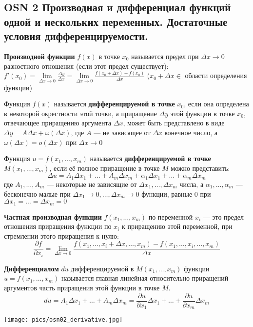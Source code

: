 \subsection*{OSN 2 Производная и дифференциал функций одной и нескольких переменных. Достаточные условия дифференцируемости.}

\textbf{Производной функции} $f(x)$ в точке $x_0$ называется предел при $\Delta x \to 0$ разностного отношения (если этот предел существует): $f'(x_0) = \lim \limits_{\Delta x \to 0}\frac{\Delta y}{\Delta x} = \lim \limits_{\Delta x \to 0} \frac{f(x_0+\Delta x)-f(x_0)}{\Delta x}$ ($x_0 + \Delta x \in$ области определения функции)

\bigbreak
Функция $f(x)$ называется \textbf{дифференцируемой в точке} $x_0$, если она определена в некоторой окрестности этой точки, а приращение $\Delta y$ этой функции в точке $x_0$, отвечающее приращению аргумента $\Delta x$, может быть представлено в виде $\Delta y = A \Delta x+ \omega(\Delta x)$, где $A$ --- не зависящее от $\Delta x$ конечное число, а $\omega(\Delta x) = o(\Delta x)$ при $\Delta x \to 0$

\bigbreak
Функция $u = f(x_1,\dots,x_m)$ называется \textbf{дифференцируемой в точке $M(x_1,\dots,x_m)$}, если её полное приращение в точке $M$ можно представить: 
$$ \Delta u= A_1 \Delta x_1 +\dots+A_m \Delta x_m + \alpha_1 \Delta x_1 +\dots+ \alpha_m \Delta x_m $$
где $A_1, \dots, A_m$ --- некоторые не зависящие от $\Delta x_1, \dots, \Delta x_m$ числа, а $ \alpha_1, \dots, \alpha_m$ --- бесконечно малые при $\Delta x_1 \to 0, \dots, \Delta x_m \to 0$ функции, равные 0 при $\Delta x_1 = \dots = \Delta x_m = 0$

\bigbreak
\textbf{Частная производная функции} $f(x_1,\dots,x_m)$ по переменной $x_i$ --- это предел отношения приращения функции по $x_i$ к приращению этой переменной, при стремлении этого приращения к нулю: $$ \frac{\partial f}{\partial x_i} = \lim\limits_{\Delta x \to 0}\frac{ f(x_1,\dots,x_i +\Delta x,\dots,x_m)-f(x_1,\dots,x_i,\dots,x_m)}{\Delta x}$$

\bigbreak
\textbf{Дифференциалом} $du$ дифференцируемой в $M(x_1,\dots,x_m)$ функции $u = f(x_1,\dots,x_m)$ называется главная линейная относительно приращений аргументов часть приращения этой функции в точке $M.$
$$du=A_1\Delta x_1 +\dots+A_m \Delta x_m = \frac{\partial u}{\partial x_1}\Delta x_1 +\dots+ \frac{\partial u}{\partial x_m}\Delta x_m$$

\texttt{[image: pics/osn02\_derivative.jpg]}

